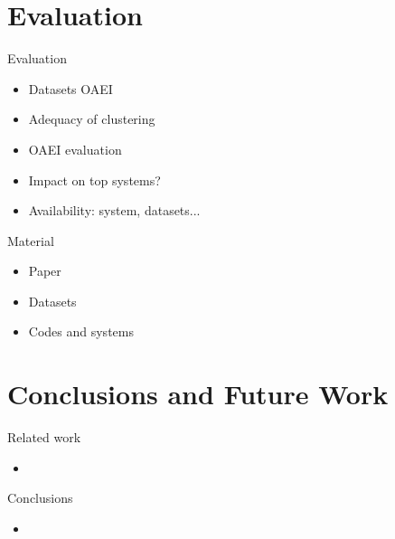 \documentclass[t]{beamer}
\begin{document}
\section{Evaluation}


\begin{frame}{Evaluation}
	
  		\begin{itemize}    
  			\item Datasets OAEI
  			\item Adequacy of clustering
  			\item OAEI evaluation
  			\item Impact on top systems?
  			\item Availability: system, datasets...
		\end{itemize}
  	
\end{frame}



\begin{frame}{Material}
	
  		\begin{itemize}    
  			\item Paper
  			\item Datasets
  			\item Codes and systems
		\end{itemize}
  	
\end{frame}



\section{Conclusions and Future Work}



\begin{frame}{Related work}

  		\begin{itemize}    
  			\item 
		\end{itemize}
  	
\end{frame}




\begin{frame}{Conclusions}

  		\begin{itemize}    
  			\item 
		\end{itemize}
  	
\end{frame}
\end{document}
